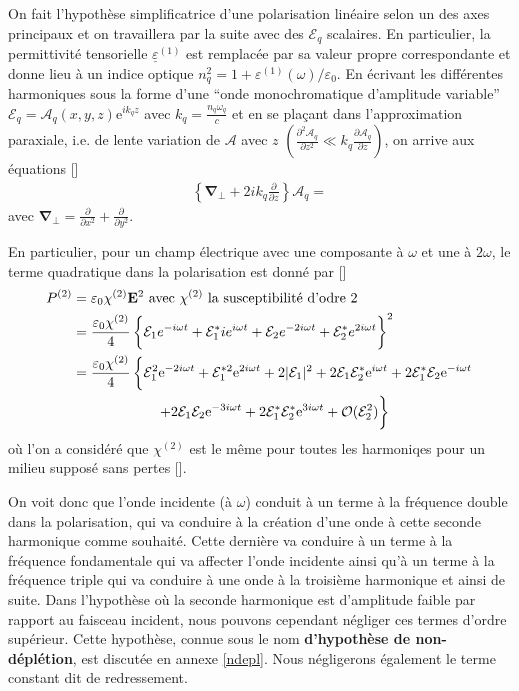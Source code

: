 \documentclass[11pt,a4paper] { article}
\newcommand{\ncite}[1]{[\citenum{#1}]}
\newcommand{\pdv}[2]{\frac{\partial #1}{\partial #2}}
\newcommand{\E}{\mathcal E}
\newcommand{\A}{\mathcal A}
\newcommand{\e}[1]{\text{e}^{#1}}
\renewcommand{\v}[1]{\mathbf{#1}}
\newcommand{\tens}[1]{\underline{#1}}
\begin{document}
On fait l'hypothèse simplificatrice d'une polarisation linéaire selon un des axes principaux et on travaillera par la suite avec des $\mathcal E_q$ scalaires. En particulier, la permittivité tensorielle $\tens \varepsilon^{(1)}$ est remplacée par sa valeur propre correspondante et donne lieu à un indice optique $n_q^2 = 1 + \varepsilon^{(1)}(\omega)/\varepsilon_0$. En écrivant les différentes harmoniques sous la forme d'une ``onde monochromatique d'amplitude variable'' $\mathcal E_q = \A_q(x,y,z) \e{ik_qz}$ avec $\boxed{k_q =\frac{n_q \omega_q}{c}}$ et en se plaçant dans l'approximation paraxiale, i.e. de lente variation de $\A$ avec $z$ $\left(\frac{\partial^2 \A_q}{\partial z^2} \ll k_q \frac{\partial \A_q}{\partial z}\right)$, on arrive aux équations \ncite{joffre}
\begin{align*}  
	\left\{\v\nabla_\bot + 2 i k_q \frac{\partial}{\partial z} \right\} \A_q =
\end{align*}
avec $\v\nabla_\bot = \pdv{}{x^2} + \pdv{}{y^2}$.

En particulier, pour un champ électrique avec une composante à $\omega$ et une à $2\omega$, le terme quadratique dans la polarisation est donné par \ncite{joffre}
\begin{align*}
	P^{(2)} &= \varepsilon_0 \chi^{(2)} \v E^2  \text{ avec $\chi^{(2)}$ la susceptibilité d'odre 2}\\
	&= \frac{\varepsilon_0 \chi^{(2)}}{4} \left\{\mathcal E_1 e^{-i\omega t} + \mathcal E_1^*i e^{i\omega t} + \mathcal E_2 e^{-2i\omega t} + \mathcal E_2^* e^{2i\omega t} \vphantom{\frac12}\right\}^2 \\
	&= \frac{\varepsilon_0 \chi^{(2)}}{4} \left\{\mathcal E_1^2 \e{-2i\omega t} + \E_1^{*2} \e{2i\omega t} + 2|\mathcal E_1|^2 + 2 \E_1\E_2^* \e{i\omega t} + 2 \E_1^*\E_2 \e{-i\omega t} \vphantom{\frac12}\right. \\
	&\qquad\qquad\qquad \left. + 2 \E_1\E_2 \e{-3 i\omega t}  + 2 \E_1^*\E_2^* \e{3 i\omega t} + \mathcal O(\E_2^2) \vphantom{\frac12}\right\}
\end{align*}
où l'on a considéré que $\chi^{(2)}$ est le même pour toutes les harmoniqes pour un milieu supposé sans pertes \ncite{boyd}.

On voit donc que l'onde incidente (à $\omega$) conduit à un terme à la fréquence double dans la polarisation, qui va conduire à la création d'une onde à cette seconde harmonique comme souhaité. Cette dernière va conduire à un terme à la fréquence fondamentale qui va affecter l'onde incidente ainsi qu'à un terme à la fréquence triple qui va conduire à une onde à la troisième harmonique et ainsi de suite. 
Dans l'hypothèse où la seconde harmonique est d'amplitude faible par rapport au faisceau incident, nous pouvons cependant négliger ces termes d'ordre supérieur. Cette hypothèse, connue sous le nom \textbf{d'hypothèse de non-déplétion}, est discutée en annexe \ref{ndepl}. Nous négligerons également le terme constant dit de redressement. %
\end{document}
